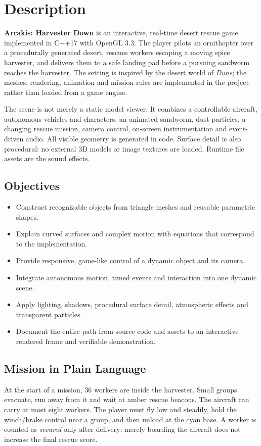 \section{Description}
\textbf{Arrakis: Harvester Down} is an interactive, real-time desert rescue game implemented in C++17 with OpenGL 3.3. The player pilots an ornithopter over a procedurally generated desert, rescues workers escaping a moving spice harvester, and delivers them to a safe landing pad before a pursuing sandworm reaches the harvester. The setting is inspired by the desert world of \emph{Dune}; the meshes, rendering, animation and mission rules are implemented in the project rather than loaded from a game engine.

The scene is not merely a static model viewer. It combines a controllable aircraft, autonomous vehicles and characters, an animated sandworm, dust particles, a changing rescue mission, camera control, on-screen instrumentation and event-driven audio. All visible geometry is generated in code. Surface detail is also procedural: no external 3D models or image textures are loaded. Runtime file assets are the sound effects.

\subsection{Objectives}
\begin{itemize}
\item Construct recognizable objects from triangle meshes and reusable parametric shapes.
\item Explain curved surfaces and complex motion with equations that correspond to the implementation.
\item Provide responsive, game-like control of a dynamic object and its camera.
\item Integrate autonomous motion, timed events and interaction into one dynamic scene.
\item Apply lighting, shadows, procedural surface detail, atmospheric effects and transparent particles.
\item Document the entire path from source code and assets to an interactive rendered frame and verifiable demonstration.
\end{itemize}

\subsection{Mission in Plain Language}
At the start of a mission, 36 workers are inside the harvester. Small groups evacuate, run away from it and wait at amber rescue beacons. The aircraft can carry at most eight workers. The player must fly low and steadily, hold the winch/brake control near a group, and then unload at the cyan base. A worker is counted as \emph{secured} only after delivery; merely boarding the aircraft does not increase the final rescue score.

